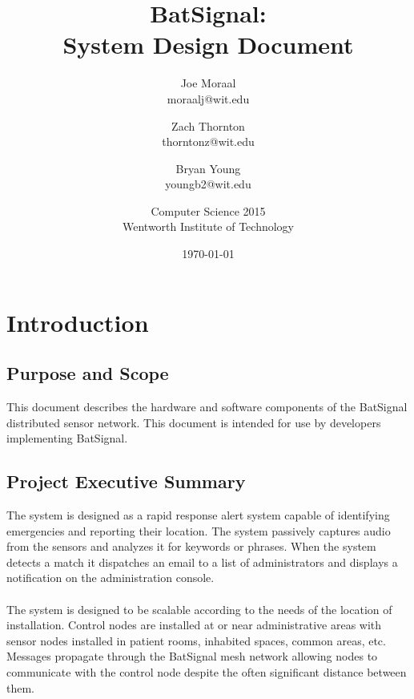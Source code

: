 \documentclass[11pt,a4paper]{article}
\begin{document}
\title{BatSignal:\\System Design Document}
\author{
	Joe Moraal\\moraalj@wit.edu\\ \and
	Zach Thornton\\thorntonz@wit.edu \and
    Bryan Young\\youngb2@wit.edu \and
	Computer Science 2015 \\
	Wentworth Institute of Technology
}
\date{\today}

\maketitle
\newpage

\tableofcontents{}
\newpage


\section{Introduction}

\subsection{Purpose and Scope}
This document describes the hardware and software components of the BatSignal distributed sensor network. This document is intended for use by developers implementing BatSignal.

\subsection{Project Executive Summary}
The system is designed as a rapid response alert system capable of identifying emergencies and reporting their location. The system passively captures audio from the sensors and analyzes it for keywords or phrases. When the system detects a match it dispatches an email to a list of administrators and displays a notification on the administration console. \\\\
The system is designed to be scalable according to the needs of the location of installation. Control nodes are installed at or near administrative areas with sensor nodes installed in patient rooms, inhabited spaces, common areas, etc. Messages propagate through the BatSignal mesh network allowing nodes to communicate with the control node despite the often significant distance between them.
\end{document}
